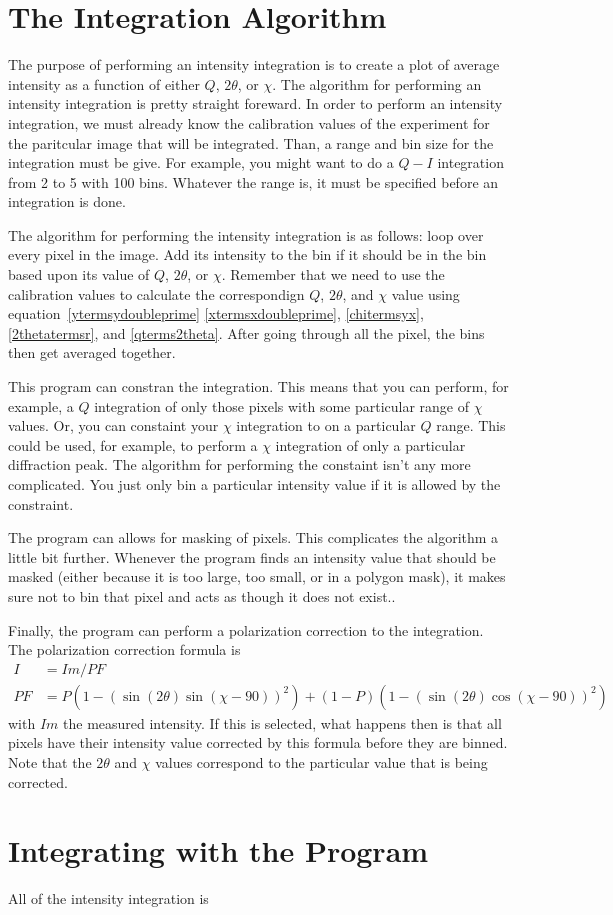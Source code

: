 \section{The Integration Algorithm}

The purpose of performing an intensity integration is 
to create a plot of average intensity as a function
of either $Q$, $2\theta$, or $\chi$. The algorithm
for performing an intensity integration is pretty
straight foreward. In order to perform an intensity
integration, we must already know the calibration values
of the experiment for the paritcular image that will
be integrated. Than, a range and bin size for the
integration must be give. For example, you might
want to do a $Q-I$ integration from 2 to 5 with
100 bins. Whatever the range is, it 
must be specified before an integration is done.

The algorithm for performing the intensity integration
is as follows: loop over every pixel in the image. 
Add its intensity to the bin if it should be
in the bin based upon its value of $Q$, $2\theta$, or 
$\chi$. Remember that we need to use the calibration
values to calculate the correspondign $Q$, $2\theta$, and 
$\chi$ value using equation~\ref{ytermsydoubleprime}
\ref{xtermsxdoubleprime}, \ref{chitermsyx}, 
\ref{2thetatermsr}, and \ref{qterms2theta}.
After going through all the pixel, the bins then get averaged 
together. 

This program can constran the integration. 
This means that you can perform, for example,
a $Q$ integration of only those pixels with some
particular range of $\chi$ values. Or, you can
constaint your $\chi$ integration to on a particular
$Q$ range. This could be used, for example, to
perform a $\chi$ integration of only a particular
diffraction peak. The algorithm for performing
the constaint isn't any more complicated. You just
only bin a particular intensity value if it is
allowed by the constraint.

The program can allows for masking of pixels.
This complicates the algorithm a little bit further.
Whenever the program finds an intensity value
that should be masked (either because it is too 
large, too small, or in a polygon mask), it makes
sure not to bin that pixel and acts as though
it does not exist..

Finally, the program can perform a polarization 
correction to the integration. The polarization 
correction formula is
\begin{align}
    I&=Im/PF \\ 
    PF&=P(1 - (\sin(2\theta)\sin(\chi-90))^2) + 
    (1 - P)(1 - (\sin(2\theta)\cos(\chi-90))^2)
\end{align}
with $Im$ the measured intensity. If this
is selected, what happens
then is that all pixels have their intensity
value corrected by this formula before they
are binned. Note that the $2\theta$ and $\chi$
values correspond to the particular value
that is being corrected.

\section{Integrating with the Program}

All of the intensity integration is 
